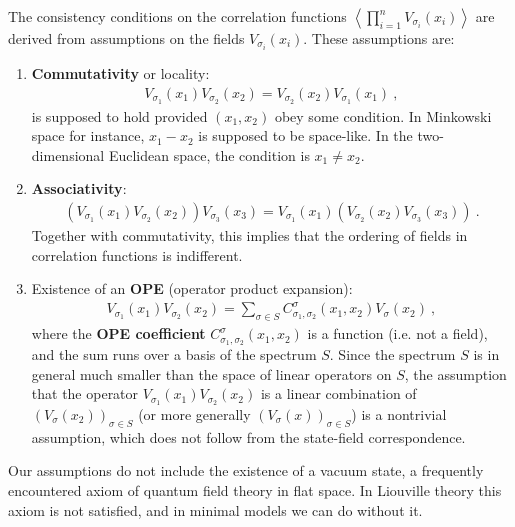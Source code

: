 \documentclass[12pt,a4paper,notitlepage]{report}
\numberwithin{equation}{section}
\theoremstyle{break}
\begin{document}
The consistency conditions on the correlation functions $\left\langle\prod_{i=1}^n V_{\sigma_i}(x_i)\right\rangle$ are derived from assumptions on the fields $V_{\sigma_i}(x_i)$.
These assumptions are:
\begin{enumerate}
 \item \textbf{Commutativity} or locality: 
\begin{align}
 \boxed{V_{\sigma_1}(x_1)V_{\sigma_2}(x_2) = V_{\sigma_2}(x_2) V_{\sigma_1}(x_1)}\ ,
\label{comm}
\end{align}
is supposed to hold provided $(x_1,x_2)$ obey some condition.
In Minkowski space for instance, $x_1-x_2$ is supposed to be space-like.
In the two-dimensional Euclidean space, the condition is $x_1\neq x_2$.
\item \textbf{Associativity}: 
\begin{align}
 \boxed{\left(V_{\sigma_1}(x_1)V_{\sigma_2}(x_2)\right) V_{\sigma_3}(x_3) = V_{\sigma_1}(x_1)  \left(V_{\sigma_2}(x_2) V_{\sigma_3}(x_3)\right)}\ .
\label{asso}
\end{align}
Together with commutativity, this implies that the ordering of fields in correlation functions is indifferent.
\item Existence of an \textbf{\boldmath OPE} (operator product expansion):
\begin{align}
 \boxed{V_{\sigma_1}(x_1)V_{\sigma_2}(x_2) = \sum_{\sigma\in S} C_{\sigma_1,\sigma_2}^{\sigma}(x_1,x_2) V_{\sigma}(x_2)}\ ,
\label{ope}
\end{align}
where the \textbf{\boldmath OPE coefficient} $C_{\sigma_1,\sigma_2}^{\sigma}(x_1,x_2)$ is a function (i.e.
not a field), and the sum runs over a basis of the spectrum $S$.
Since the spectrum $S$ is in general much smaller than the space of linear operators on $S$, the assumption that the operator $V_{\sigma_1}(x_1)V_{\sigma_2}(x_2)$ is a linear combination of $(V_{\sigma}(x_2))_{\sigma\in S}$ (or more generally $(V_{\sigma}(x))_{\sigma\in S}$) is a nontrivial assumption, which does not follow from the state-field correspondence.
\end{enumerate}
Our assumptions do not include the existence of a vacuum state, a frequently encountered axiom of quantum field theory in flat space.
In Liouville theory this axiom is not satisfied, and in minimal models we can do without it. 
\end{document}
